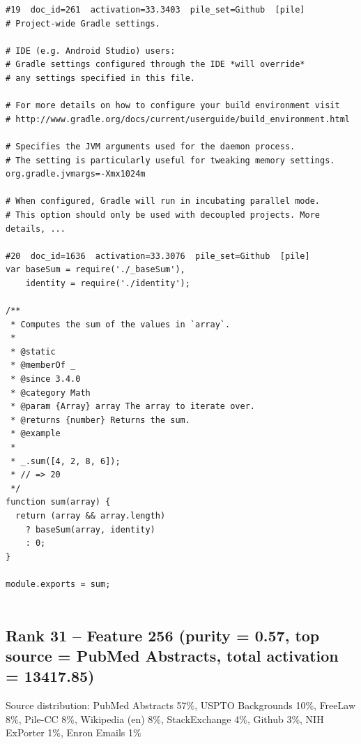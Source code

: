 \begin{verbatim}
#19  doc_id=261  activation=33.3403  pile_set=Github  [pile]
# Project-wide Gradle settings.

# IDE (e.g. Android Studio) users:
# Gradle settings configured through the IDE *will override*
# any settings specified in this file.

# For more details on how to configure your build environment visit
# http://www.gradle.org/docs/current/userguide/build_environment.html

# Specifies the JVM arguments used for the daemon process.
# The setting is particularly useful for tweaking memory settings.
org.gradle.jvmargs=-Xmx1024m

# When configured, Gradle will run in incubating parallel mode.
# This option should only be used with decoupled projects. More details, ...

#20  doc_id=1636  activation=33.3076  pile_set=Github  [pile]
var baseSum = require('./_baseSum'),
    identity = require('./identity');

/**
 * Computes the sum of the values in `array`.
 *
 * @static
 * @memberOf _
 * @since 3.4.0
 * @category Math
 * @param {Array} array The array to iterate over.
 * @returns {number} Returns the sum.
 * @example
 *
 * _.sum([4, 2, 8, 6]);
 * // => 20
 */
function sum(array) {
  return (array && array.length)
    ? baseSum(array, identity)
    : 0;
}

module.exports = sum;


\end{verbatim}

\subsection*{Rank 31 -- Feature 256 (purity = 0.57, top source = PubMed Abstracts, total activation = 13417.85)}

Source distribution: PubMed Abstracts 57\%, USPTO Backgrounds 10\%, FreeLaw 8\%, Pile-CC 8\%, Wikipedia (en) 8\%, StackExchange 4\%, Github 3\%, NIH ExPorter 1\%, Enron Emails 1\%

